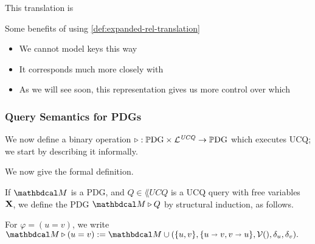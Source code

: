 \documentclass[the-pdg-manual.tex]{subfiles}
\begin{document}
This translation is

\begin{defn}\label{def:compact-rel-translation}

\end{defn}
Some benefits of using \cref{def:expanded-rel-translation}
\begin{itemize}[nosep]
	\item We cannot model keys this way
	\item It corresponds much more closely with 
	\item As we will see soon, this representation gives us more control over which 
\end{itemize}

\begin{defn}
\end{defn}


\subsubsection{Query Semantics for PDGs}

We now define a binary operation $\triangleright : \mathbb{P}\mathrm{DG} \times \mathcal L^{\mathit{UCQ}} \to \mathbb{P}\mathrm{DG}$ which executes UCQ; we 
start by describing it informally.

We now give the formal definition.
\begin{defn}[\texorpdfstring{$\qq$}{>}]
  If $\dg M$ is a PDG, and $Q \in \lang{UCQ}$ is a UCQ query with free variables $\mathbf X$, we define the PDG $\dg M \qq Q$ by structural induction, as follows.

\begin{description}
	\item For $\varphi = (u=v)$, we write $\dg M \qq  (u = v) :=  \dg M \cup (\{u,v\}, \{u\shortrightarrow v, v\shortrightarrow u\}, \V(), \delta_{u}, \delta_{v}).$
\end{description}
\end{defn}
\end{document}
